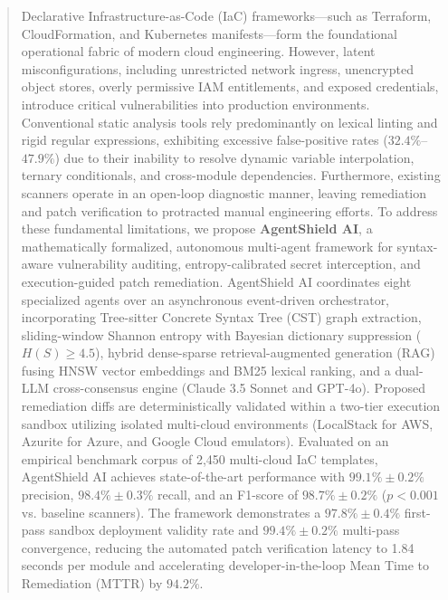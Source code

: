 \documentclass[runningheads]{llncs}
\begin{document}
\begin{abstract}
Declarative Infrastructure-as-Code (IaC) frameworks---such as Terraform, Cloud\-Formation, and Kubernetes manifests---form the foundational operational fabric of modern cloud engineering. However, latent misconfigurations, including unrestricted network ingress, unencrypted object stores, overly permissive IAM entitlements, and exposed credentials, introduce critical vulnerabilities into production environments. Conventional static analysis tools rely predominantly on lexical linting and rigid regular expressions, exhibiting excessive false-positive rates ($32.4\%$--$47.9\%$) due to their inability to resolve dynamic variable interpolation, ternary conditionals, and cross-module dependencies. Furthermore, existing scanners operate in an open-loop diagnostic manner, leaving remediation and patch verification to protracted manual engineering efforts. To address these fundamental limitations, we propose \textbf{AgentShield AI}, a mathematically formalized, autonomous multi-agent framework for syntax-aware vulnerability auditing, entropy-calibrated secret interception, and execution-guided patch remediation. AgentShield AI coordinates eight specialized agents over an asynchronous event-driven orchestrator, incorporating Tree-sitter Concrete Syntax Tree (CST) graph extraction, sliding-window Shannon entropy with Bayesian dictionary suppression ($H(S) \ge 4.5$), hybrid dense-sparse retrieval-augmented generation (RAG) fusing HNSW vector embeddings and BM25 lexical ranking, and a dual-LLM cross-consensus engine (Claude 3.5 Sonnet and GPT-4o). Proposed remediation diffs are deterministically validated within a two-tier execution sandbox utilizing isolated multi-cloud environments (LocalStack for AWS, Azurite for Azure, and Google Cloud emulators). Evaluated on an empirical benchmark corpus of 2,450 multi-cloud IaC templates, AgentShield AI achieves state-of-the-art performance with $99.1\% \pm 0.2\%$ precision, $98.4\% \pm 0.3\%$ recall, and an F1-score of $98.7\% \pm 0.2\%$ ($p < 0.001$ vs. baseline scanners). The framework demonstrates a $97.8\% \pm 0.4\%$ first-pass sandbox deployment validity rate and $99.4\% \pm 0.2\%$ multi-pass convergence, reducing the automated patch verification latency to 1.84 seconds per module and accelerating developer-in-the-loop Mean Time to Remediation (MTTR) by $94.2\%$.

\end{abstract}
%
%
%
\end{document}
